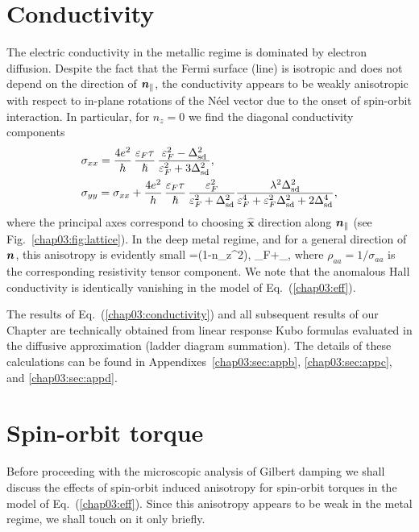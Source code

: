 \section{Conductivity}\label{chap03:sec:cond}
The electric conductivity in the metallic regime is dominated by electron diffusion. Despite the fact that the Fermi surface (line) is isotropic and does not depend on the direction of $\boldsymbol{n}_\parallel$, the conductivity appears to be weakly anisotropic with respect to in-plane rotations of the N\'eel vector due to the onset of spin-orbit interaction. 
In particular, for $n_z=0$ we find the diagonal conductivity components
\beml
\label{chap03:conductivity}
\begin{align}
\label{chap03:chap3:eq:long_cond}
&\sigma_{xx}= \frac{4e^2}{h}\,\frac{\varepsilon_F \tau}{\hslash}\,\frac{\varepsilon_F^2-\Delta_{\text{sd}}^2}{\varepsilon_F^2+3\Delta_{\text{sd}}^2},\\
&\sigma_{yy}= \sigma_{xx}+\frac{4e^2}{h}\,\frac{\varepsilon_F \tau}{\hslash}\, \frac{\varepsilon_F^2}{\varepsilon_F^2+\Delta_{\text{sd}}^2}
\frac{\lambda^2\Delta_{\text{sd}}^2}{\varepsilon_F^4+\varepsilon_F^2\Delta_{\text{sd}}^2+2\Delta_{\text{sd}}^4},
\end{align}
\eml
where the principal axes correspond to choosing $\hat{\bm{x}}$ direction along $\boldsymbol{n}_\parallel$ (see Fig.~\ref{chap03:fig:lattice}). In the deep metal regime, and for a general direction of $\boldsymbol{n}$, this anisotropy is evidently small
\be
\label{chap03:ani}
=(1-n_z^2), \quad \ep_F\gg \lambda+\Delta_{},
\e
where $\rho_{aa}=1/\sigma_{aa}$ is the corresponding resistivity tensor component. We note that the anomalous Hall conductivity is identically vanishing in the model of Eq.~(\ref{chap03:eff}). 

The results of Eq.~(\ref{chap03:conductivity}) and all subsequent results of our Chapter are technically obtained from linear response Kubo formulas evaluated in the diffusive approximation (ladder diagram summation). The details of these calculations can be found in Appendixes~\ref{chap03:sec:appb}, \ref{chap03:sec:appc}, and \ref{chap03:sec:appd}. 

\section{Spin-orbit torque}\label{chap03:sec:sot}

Before proceeding with the microscopic analysis of Gilbert damping we shall discuss the effects of spin-orbit induced anisotropy for spin-orbit torques in the model of Eq.~(\ref{chap03:eff}). Since this anisotropy appears to be weak in the metal regime, we shall touch on it only briefly. 

